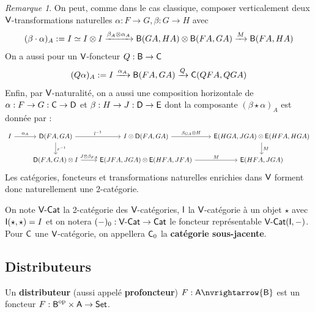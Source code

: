 \documentclass[8pt,a4paper,french,draft]{article}
\newcommand{\cat}[1]{\textcat{#1}}
\newcommand{\textcat}[1]{{\normalfont\textsf{#1}}}
\DeclareMathOperator{\op}{op}
\theoremstyle{plain}
\theoremstyle{definition}
\theoremstyle{remark}
\newtheorem{remark}[theorem]{Remarque}
\begin{document}
\begin{remark}
    On peut, comme dans le cas classique, composer verticalement deux $\cat{V}$-transformations naturelles $\alpha : F \to G, \beta : G \to H$ avec
    \[
        (\beta\cdot\alpha)_A := I \simeq I \otimes I \xrightarrow{\beta_A \otimes \alpha_A} \cat{B}(GA, HA) \otimes \cat{B}(FA, GA) \xrightarrow{M} \cat{B}(FA, HA)
    \]
    On a aussi pour un $\cat{V}$-foncteur $Q : \cat{B} \to \cat{C}$
    \[
        (Q\alpha)_A := I \xrightarrow{\alpha_A} \cat{B}(FA, GA) \xrightarrow{Q} \cat{C}(QFA, QGA)
    \]
    Enfin, par $\cat{V}$-naturalité, on a aussi une composition horizontale de $\alpha : F \to G : \cat{C} \to \cat{D}$ et $\beta : H \to J : \cat{D} \to \cat{E}$ dont la composante $(\beta \star \alpha)_A$ est donnée par :
    \[\begin{tikzcd}
        I \ar[r, "\alpha_A"] & \cat{D}(FA, GA) \ar[r, "l^{-1}"] \ar[d, "r^{-1}"] & I \otimes \cat{D}(FA, GA) \ar[r, "\beta_{GA} \otimes H"]
                             & \cat{E}(HGA, JGA) \otimes \cat{E}(HFA, HGA) \ar[d, "M"]\\
                             & \cat{D}(FA, GA) \otimes I \ar[r, "J \otimes \beta_{FA}"] & \cat{E}(JFA, JGA) \otimes \cat{E}(HFA, JFA)
                                \ar[r, "M"] & \cat{E}(HFA, JGA)
    \end{tikzcd}\]
    Les catégories, foncteurs et transformations naturelles enrichies dans $\cat{V}$ forment donc naturellement une 2-catégorie.
\end{remark}

\begin{definition}
    On note $\cat{V-Cat}$ la 2-catégorie des $\cat{V}$-catégories, $\cat{I}$ la $\cat{V}$-catégorie à un objet $\star$ avec $\cat{I}(\star, \star) = I$ et on notera $(-)_0 : \cat{V-Cat} \to \cat{Cat}$ le foncteur représentable $\cat{V-Cat}(\cat{I}, -)$. Pour $\cat{C}$ une $\cat{V}$-catégorie, on appellera $\cat{C}_0$ la \textbf{catégorie sous-jacente}.
\end{definition}

\subsection{Distributeurs}

\begin{definition}
    Un \textbf{distributeur} (aussi appelé \textbf{profoncteur}) $F : \cat{A} \nvrightarrow \cat{B}$ est un foncteur $F : \cat{B}^{\op} \times \cat{A} \to \cat{Set}$.
\end{definition}
\end{document}
